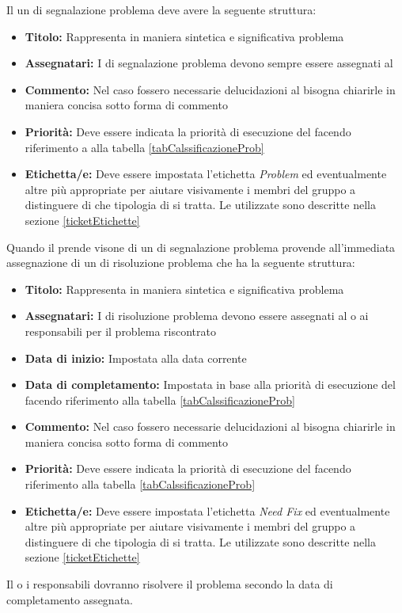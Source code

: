 \documentclass[12pt,a4paper]{article}
\begin{document}
\label{ticketProblema}
Il un  di segnalazione problema deve avere la seguente struttura:

\begin{itemize}
	\item \textbf{Titolo:} Rappresenta in maniera sintetica e significativa problema
	\item \textbf{Assegnatari:} I  di segnalazione problema devono sempre essere assegnati al \RE
	\item \textbf{Commento:} Nel caso fossero necessarie delucidazioni al  bisogna chiarirle in maniera concisa sotto forma di commento
	\item \textbf{Priorità:} Deve essere indicata la priorità di esecuzione del  facendo riferimento a alla tabella \ref{tabCalssificazioneProb}
	\item \textbf{Etichetta/e:} Deve essere impostata l'etichetta \textit{Problem} ed eventualmente altre  più appropriate  per aiutare visivamente i membri del gruppo a distinguere di che tipologia di  si tratta. Le  utilizzate sono descritte nella sezione \ref{ticketEtichette}
\end{itemize}

Quando il \RE{} prende visone di un  di segnalazione problema provende all'immediata assegnazione di un  di risoluzione problema che ha la seguente struttura:

\begin{itemize}
	\item \textbf{Titolo:} Rappresenta in maniera sintetica e significativa problema
	\item \textbf{Assegnatari:} I  di risoluzione problema devono essere assegnati al o ai responsabili per il problema riscontrato
	\item \textbf{Data di inizio:} Impostata alla data corrente
	\item \textbf{Data di completamento:} Impostata in base alla priorità di esecuzione del  facendo riferimento alla tabella \ref{tabCalssificazioneProb}
	\item \textbf{Commento:} Nel caso fossero necessarie delucidazioni al  bisogna chiarirle in maniera concisa sotto forma di commento
	\item \textbf{Priorità:} Deve essere indicata la priorità di esecuzione del  facendo riferimento alla tabella \ref{tabCalssificazioneProb}
	\item \textbf{Etichetta/e:} Deve essere impostata l'etichetta \textit{Need Fix} ed eventualmente altre  più appropriate  per aiutare visivamente i membri del gruppo a distinguere di che tipologia di  si tratta. Le  utilizzate sono descritte nella sezione \ref{ticketEtichette}
\end{itemize}
Il o i responsabili dovranno risolvere il problema secondo la data di completamento assegnata.
\end{document}
